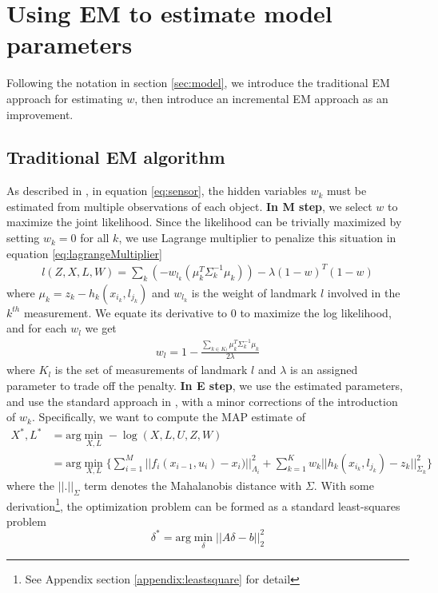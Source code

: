 \section{Using EM to estimate model parameters}
Following the notation in section \ref{sec:model}, we introduce the traditional EM approach for estimating $w$, then introduce an incremental EM approach as an  improvement.
\subsection{Traditional EM algorithm}
\label{sec:traditionalEM}
As described in \cite{rogers2010slam}, in equation \ref{eq:sensor}, the hidden variables $w_k$ must be estimated from multiple observations of each object. \textbf{In M step}, we select $w$ to maximize the joint likelihood. Since the likelihood can be trivially maximized by setting $w_k = 0$ for all $k$, we use Lagrange multiplier to penalize this situation in equation \ref{eq:lagrangeMultiplier}
\begin{equation}
\begin{aligned}
l(Z, X, L, W) = \sum\limits_k(-w_{l_k}(\mu_k^T\Sigma_k^{-1}\mu_k)) - \lambda(1 - w)^T(1 - w)
\end{aligned}
\label{eq:lagrangeMultiplier}
\end{equation}
where $\mu_k = z_k - h_k(x_{i_k}, l_{j_k})$ and $w_{l_k}$ is the weight of landmark $l$ involved in the $k^{th}$ measurement. We equate its derivative to 0 to maximize the log likelihood, and for each $w_l$ we get
\begin{equation}
\begin{aligned}
w_l = 1 - \frac{\sum_{k \in K_l}\mu_k^T\Sigma_k^{-1}\mu_k}{2\lambda}
\end{aligned}
\label{eq:wk}
\end{equation}
where $K_l$ is the set of measurements of landmark $l$ and $\lambda$ is an assigned parameter to trade off the penalty. \textbf{In E step}, we use the estimated parameters, and use the standard approach in \cite{isam}, with a minor corrections of the introduction of $w_k$. Specifically, we want to compute the MAP estimate of 
\begin{equation}
\begin{aligned}
X^*, L^* &= \text{arg}\min\limits_{X, L}-\log(X, L, U, Z, W)\\
&=\text{arg}\min\limits_{X, L}\{\sum\limits_{i=1}^M||f_i(x_{i-1}, u_i) - x_i)||^2_{\Lambda_i} + \sum\limits_{k=1}^Kw_k||h_k(x_{i_k}, l_{j_k}) - z_k||^2_{\Sigma_k}\}
\end{aligned}
\label{eq:MAP}
\end{equation}
where the $||.||_\Sigma$ term denotes the Mahalanobis distance with $\Sigma$. With some derivation\footnote{See Appendix section \ref{appendix:leastsquare} for detail}, the optimization problem can be formed as a standard least-squares problem
\begin{equation}
\delta^* = \text{arg}\min\limits_\delta||A\delta - b||_2^2
\label{eq:optimization}
\end{equation}

